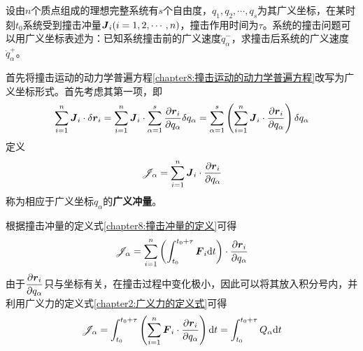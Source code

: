 设由$n$个质点组成的理想完整系统有$s$个自由度，$q_1,q_2,\cdots,q_s$为其广义坐标，在某时刻$t_0$系统受到撞击冲量$\boldsymbol{J}_i(i=1,2,\cdots,n)$，撞击作用时间为$\tau$。系统的撞击问题可以用广义坐标表述为：已知系统撞击前的广义速度$\dot{q}_\alpha^-$，求撞击后系统的广义速度$\dot{q}_\alpha^+$。

首先将撞击运动的动力学普遍方程\eqref{chapter8:撞击运动的动力学普遍方程}改写为广义坐标形式。首先考虑其第一项，即
\begin{equation}
	\sum_{i=1}^n \boldsymbol{J}_i \cdot \delta\boldsymbol{r}_i = \sum_{i=1}^n \boldsymbol{J}_i \cdot \sum_{\alpha=1}^s \frac{\partial \boldsymbol{r}_i}{\partial q_\alpha} \delta q_\alpha = \sum_{\alpha=1}^s \left(\sum_{i=1}^n\boldsymbol{J}_i\cdot \frac{\partial \boldsymbol{r}_i}{\partial q_\alpha}\right) \delta q_\alpha
	\label{chapter8:撞击运动的Lagrange方程-第一部分}
\end{equation}
定义
\begin{equation}
	\mathscr{J}_\alpha = \sum_{i=1}^n \boldsymbol{J}_i\cdot \frac{\partial \boldsymbol{r}_i}{\partial q_\alpha}
	\label{chapter8:广义冲量的定义式}
\end{equation}
称为相应于广义坐标$q_\alpha$的{\bf 广义冲量}。

根据撞击冲量的定义式\eqref{chapter8:撞击冲量的定义}可得
\begin{equation*}
	\mathscr{J}_\alpha = \sum_{i=1}^n \left(\int_{t_0}^{t_0+\tau} \boldsymbol{F}_i\mathrm{d} t\right) \cdot \frac{\partial \boldsymbol{r}_i}{\partial q_\alpha}
\end{equation*}
由于$\dfrac{\partial \boldsymbol{r}_i}{\partial q_\alpha}$只与坐标有关，在撞击过程中变化极小，因此可以将其放入积分号内，并利用广义力的定义式\eqref{chapter2:广义力的定义式}可得
\begin{equation}
	\mathscr{J}_\alpha = \int_{t_0}^{t_0+\tau} \left(\sum_{i=1}^n \boldsymbol{F}_i \cdot \frac{\partial \boldsymbol{r}_i}{\partial q_\alpha}\right)\mathrm{d} t = \int_{t_0}^{t_0+\tau} Q_\alpha\mathrm{d} t
\end{equation}

